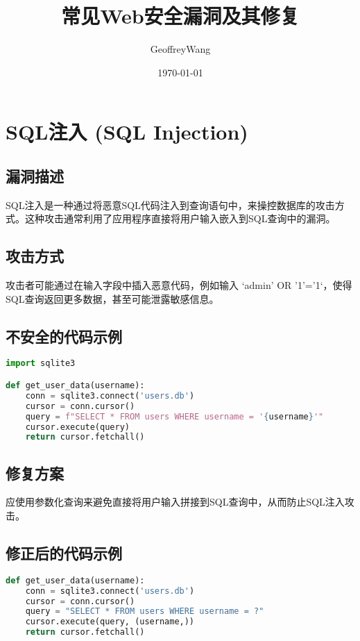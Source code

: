 \documentclass{article}
\title{常见Web安全漏洞及其修复}
\author{GeoffreyWang}
\date{\today}
\begin{document}
\maketitle

\section{SQL注入 (SQL Injection)}

\subsection{漏洞描述}
SQL注入是一种通过将恶意SQL代码注入到查询语句中，来操控数据库的攻击方式。这种攻击通常利用了应用程序直接将用户输入嵌入到SQL查询中的漏洞。

\subsection{攻击方式}
攻击者可能通过在输入字段中插入恶意代码，例如输入 `admin' OR '1'='1`，使得SQL查询返回更多数据，甚至可能泄露敏感信息。

\subsection{不安全的代码示例}
\begin{lstlisting}[language=Python, caption=存在SQL注入漏洞的代码]
import sqlite3

def get_user_data(username):
    conn = sqlite3.connect('users.db')
    cursor = conn.cursor()
    query = f"SELECT * FROM users WHERE username = '{username}'"
    cursor.execute(query)
    return cursor.fetchall()
\end{lstlisting}

\subsection{修复方案}
应使用参数化查询来避免直接将用户输入拼接到SQL查询中，从而防止SQL注入攻击。

\subsection{修正后的代码示例}
\begin{lstlisting}[language=Python, caption=使用参数化查询的安全代码]
def get_user_data(username):
    conn = sqlite3.connect('users.db')
    cursor = conn.cursor()
    query = "SELECT * FROM users WHERE username = ?"
    cursor.execute(query, (username,))
    return cursor.fetchall()
\end{lstlisting}
\end{document}
